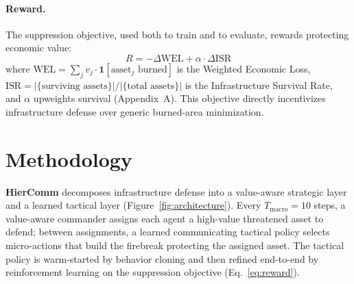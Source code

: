 \documentclass[letterpaper]{article}
\begin{document}
\paragraph{Reward.}
The suppression objective, used both to train and to evaluate, rewards protecting economic value:
\begin{equation}
\label{eq:reward}
R = -\Delta \text{WEL} + \alpha \cdot \Delta \text{ISR}
\end{equation}
where $\text{WEL} = \sum_j v_j \cdot \mathbf{1}[\text{asset}_j \text{ burned}]$ is the Weighted Economic Loss, $\text{ISR} = |\{\text{surviving assets}\}| / |\{\text{total assets}\}|$ is the Infrastructure Survival Rate, and $\alpha$ upweights survival (Appendix~A). This objective directly incentivizes infrastructure defense over generic burned-area minimization.

\section{Methodology}
\label{sec:method}

\textbf{HierComm} decomposes infrastructure defense into a value-aware strategic layer and a learned tactical layer (Figure~\ref{fig:architecture}). Every $T_{\text{macro}} = 10$ steps, a value-aware commander assigns each agent a high-value threatened asset to defend; between assignments, a learned communicating tactical policy selects micro-actions that build the firebreak protecting the assigned asset. The tactical policy is warm-started by behavior cloning and then refined end-to-end by reinforcement learning on the suppression objective (Eq.~\ref{eq:reward}).
\end{document}
